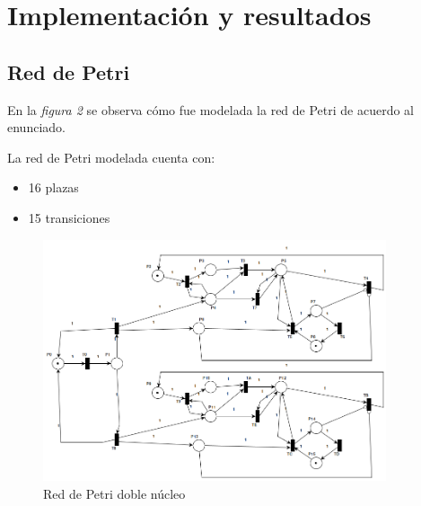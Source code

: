 \documentclass{article}
\begin{document}
    \section{Implementación y resultados}
    \subsection{Red de Petri}
    \begin{flushleft}
        En la \emph{figura 2} se observa cómo fue modelada la red de Petri de acuerdo al enunciado. \par
        La red de Petri modelada cuenta con:
    \end{flushleft}
    \begin{itemize}
        \item 16 plazas
        \item 15 transiciones
    \end{itemize}
    \begin{figure}[h]
        \includegraphics[width=0.9\textwidth, center]{rdp.png}
        \caption{Red de Petri doble núcleo}
    \end{figure}   
\end{document}

